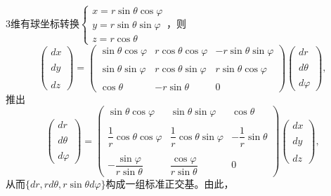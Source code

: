 \begin{itemize}
        $3$维有球坐标转换$\begin{cases} x=r\sin \theta \cos \varphi\\ 
        y= r \sin \theta \sin \varphi\\ z=r\cos \theta \end{cases}$，则
        $$\begin{pmatrix} dx\\ \\dy\\ \\dz \end{pmatrix}
        = \begin{pmatrix}\sin \theta  \cos \varphi &r \cos \theta  \cos \varphi &-r  \sin \theta  \sin \varphi\\ \\
            \sin \theta  \sin \varphi &r  \cos \theta  \sin \varphi &r \sin \theta  \cos \varphi\\ \\
            \cos \theta &-r\sin \theta &0
        \end{pmatrix} \begin{pmatrix}dr\\ \\d\theta\\ \\d\varphi \end{pmatrix},$$
        推出
            $$\begin{pmatrix}dr\\ \\d\theta\\ \\d\varphi \end{pmatrix}
            = \begin{pmatrix}\sin \theta  \cos \varphi &\sin \theta  \sin \varphi &\cos \theta\\ \\
            \dfrac{1}{r}\cos \theta  \cos \varphi &\dfrac{1}{r} \cos \theta  \sin \varphi &-\dfrac{1}{r}\sin \theta\\ \\
            -\dfrac{\sin \varphi}{r \sin \theta} & \dfrac{\cos \varphi}{r\sin \theta} &0\end{pmatrix}
            \begin{pmatrix}dx\\ \\dy\\ \\dz \end{pmatrix},$$
        从而$\{dr, rd\theta, r\sin \theta d\varphi\}$构成一组标准正交基。由此，


\end{itemize}
